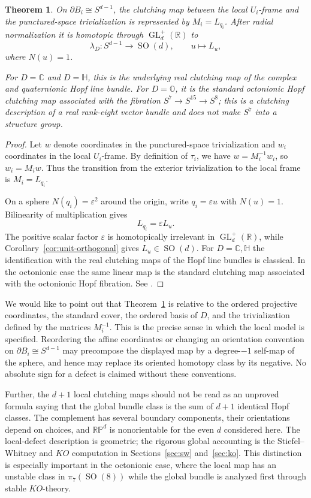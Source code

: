 \documentclass[12pt]{article}
\theoremstyle{plain}
\newtheorem{theorem}{Theorem}[section]
\theoremstyle{definition}
\newcommand{\R}{\mathbb R}
\newcommand{\C}{\mathbb C}
\newcommand{\Hh}{\mathbb H}
\newcommand{\Oct}{\mathbb O}
\newcommand{\RP}{\mathbb{RP}}
\newcommand{\GL}{\operatorname{GL}}
\newcommand{\SO}{\operatorname{SO}}
\begin{document}
\begin{theorem}
	\label{thm:local-hopf}
	On $\partial B_i\cong S^{d-1}$, the clutching map between the local
	$U_i$-frame and the punctured-space trivialization is represented by
	$M_i=L_{q_i}$. After radial normalization it is homotopic through
	$\GL_d^+(\R)$ to
	\[
	\lambda_D:S^{d-1}\longrightarrow\SO(d),
	\qquad
	u\longmapsto L_u,
	\]
	where $N(u)=1$.
	
	For $D=\C$ and $D=\Hh$, this is the underlying real clutching map of
	the complex and quaternionic Hopf line bundle. For $D=\Oct$, it is
	the standard octonionic Hopf clutching map associated with the fibration
	$S^7\to S^{15}\to S^8$; this is a clutching description of a real
	rank-eight vector bundle and does not make $S^7$ into a structure group.
\end{theorem}

\begin{proof}
	Let $w$ denote coordinates in the punctured-space trivialization and
	$w_i$ coordinates in the local $U_i$-frame. By definition of
	$\tau_i$, we have $w=M_i^{-1}w_i$, so $w_i=M_iw$. Thus the transition from the exterior trivialization to the local frame
	is $M_i=L_{q_i}$.
	
	On a sphere $N(q_i)=\varepsilon^2$ around the origin, write
	$q_i=\varepsilon u$ with $N(u)=1$. Bilinearity of multiplication gives
	\[
	L_{q_i}=\varepsilon L_u.
	\]
	The positive scalar factor $\varepsilon$ is homotopically irrelevant in
	$\GL_d^+(\R)$, while Corollary~\ref{cor:unit-orthogonal} gives
	$L_u\in\SO(d)$. For $D=\C,\Hh$ the identification with the real clutching maps of the
	Hopf line bundles is classical. In the octonionic case the same linear
	map is the standard clutching map associated with the octonionic Hopf
	fibration. See \cite{ABS,Baez}.
\end{proof}

We would like to point out that Theorem~\ref{thm:local-hopf} is relative to the ordered projective
coordinates, the standard cover, the ordered basis of $D$, and the
trivialization defined by the matrices $M_i^{-1}$. This is the precise
sense in which the local model is specified. Reordering the affine
coordinates or changing an orientation convention on
$\partial B_i\cong S^{d-1}$ may precompose the displayed map by a
degree-$-1$ self-map of the sphere, and hence may replace its oriented
homotopy class by its negative. No absolute sign for a defect is claimed
without these conventions.


Further, the $d+1$ local clutching maps should not be read as an unproved formula
saying that the global bundle class is the sum of $d+1$ identical Hopf
classes. The complement has several boundary components, their
orientations depend on choices, and $\RP^d$ is nonorientable for the even
$d$ considered here. The local-defect description is geometric; the
rigorous global accounting is the Stiefel--Whitney and $KO$ computation
in Sections~\ref{sec:sw} and~\ref{sec:ko}. This distinction is especially
important in the octonionic case, where the local map has an unstable
class in $\pi_7(\SO(8))$ while the global bundle is analyzed first through
stable $KO$-theory.
\end{document}
